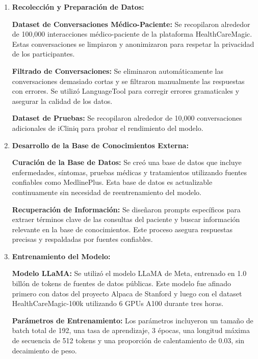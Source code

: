 	\begin{enumerate}
		
		\item \textbf{Recolección y Preparación de Datos:}
			
			\subitem \textbf{Dataset de Conversaciones Médico-Paciente:} Se recopilaron alrededor de 100,000 interacciones médico-paciente de la plataforma HealthCareMagic. Estas conversaciones se limpiaron y anonimizaron para respetar la privacidad de los participantes.
			
			\subitem \textbf{Filtrado de Conversaciones: }Se eliminaron automáticamente las conversaciones demasiado cortas y se filtraron manualmente las respuestas con errores. Se utilizó LanguageTool para corregir errores gramaticales y asegurar la calidad de los datos.
				
			\subitem \textbf{Dataset de Pruebas:} Se recopilaron alrededor de 10,000 conversaciones adicionales de iCliniq para probar el rendimiento del modelo.
			
		\item \textbf{Desarrollo de la Base de Conocimientos Externa:}
			
			\subitem \textbf{Curación de la Base de Datos:} Se creó una base de datos que incluye enfermedades, síntomas, pruebas médicas y tratamientos utilizando fuentes confiables como MedlinePlus. Esta base de datos es actualizable continuamente sin necesidad de reentrenamiento del modelo.
			
			\subitem \textbf{Recuperación de Información:} Se diseñaron prompts específicos para extraer términos clave de las consultas del paciente y buscar información relevante en la base de conocimientos. Este proceso asegura respuestas precisas y respaldadas por fuentes confiables.
		
		\item \textbf{Entrenamiento del Modelo:}
			
			\subitem \textbf{Modelo LLaMA:} Se utilizó el modelo LLaMA de Meta, entrenado en 1.0 billón de tokens de fuentes de datos públicas. Este modelo fue afinado primero con datos del proyecto Alpaca de Stanford y luego con el dataset HealthCareMagic-100k utilizando 6 GPUs A100 durante tres horas.
			
			\subitem \textbf{Parámetros de Entrenamiento:} Los parámetros incluyeron un tamaño de batch total de 192, una tasa de aprendizaje, 3 épocas, una longitud máxima de secuencia de 512 tokens y una proporción de calentamiento de 0.03, sin decaimiento de peso.
		

\end{enumerate}
